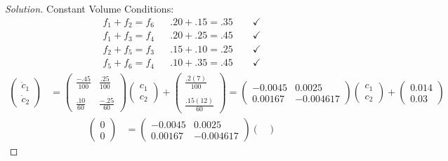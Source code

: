 \documentclass[12pt]{article}
\begin{document}
	\begin{proof}[Solution]
		Constant Volume Conditions: 
		\begin{align*}
			f_1 + f_2 = f_6 && .20 + .15 = .35 \qquad \checkmark \\
			f_1 + f_3 = f_4 && .20 + .25 = .45 \qquad \checkmark \\
			f_2 + f_5 = f_3 && .15 + .10 = .25 \qquad \checkmark \\
			f_5 + f_6 = f_4 && .10 + .35 = .45 \qquad \checkmark
		\end{align*}
		\begin{align*}
		\begin{pmatrix}
			\dot{c}_1 \\
			\dot{c}_2
		\end{pmatrix} &=
		\begin{pmatrix}
			\frac{-.45}{100} & \frac{.25}{100} \\ \\
			\frac{.10}{60} & \frac{-.25}{60}
		\end{pmatrix}
		\begin{pmatrix}
			c_1 \\ 
			c_2
		\end{pmatrix} + 
		\begin{pmatrix}
			\frac{.2(7)}{100} \\ \\
			\frac{.15(12)}{60}
		\end{pmatrix} 
		= 
		\begin{pmatrix}
			-0.0045 & 0.0025 \\
			0.00167 & -0.004617
		\end{pmatrix}
		\begin{pmatrix}
			c_1 \\
			c_2 
		\end{pmatrix} + 
		\begin{pmatrix}
			0.014 \\
			0.03
		\end{pmatrix}
		\end{align*}
		\begin{align*}
			\begin{pmatrix}
				0 \\
				0
			\end{pmatrix} &= 
			\begin{pmatrix}
				-0.0045 & 0.0025 \\
				0.00167 & -0.004617
			\end{pmatrix}
			\begin{pmatrix}

\end{pmatrix}
\end{align*}
\end{proof}
\end{document}
